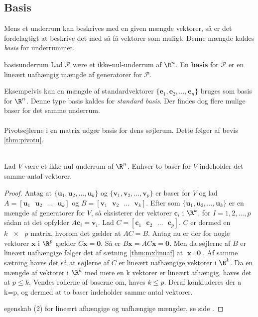 \subsection{Basis}
Mens et underrum kan beskrives med en given mængde vektorer, så er det fordelagtigt at beskrive det med så få vektorer som muligt. 
Denne mængde kaldes \textit{basis} for underrummet.
%
\begin{defn}{}{basisunderrum}
Lad $\mathcal{P}$ være et ikke-nul-underrum af $\R^n$. 
En \textbf{basis} for $\mathcal{P}$ er en lineært uafhængig mængde af generatorer for $\mathcal{P}$.
\end{defn}
\noindent
Eksempelvis kan en mængde af standardvektorer $\{\textbf{e}_1,\textbf{e}_2,\ldots,\textbf{e}_n\}$ bruges som basis for $\R^n$.
Denne type basis kaldes for \textit{standard basis}.
Der findes dog flere mulige baser for det samme underrum.
\\\\
%
Pivotsøjlerne i en matrix udgør basis for dens søjlerum. Dette følger af bevis \ref{thm:pivotu}.
\\\\
\begin{thm}{}{}
Lad $V$ være et ikke nul underrum af $\R^n$. Enhver to baser for $V$ indeholder det samme antal vektorer.
\end{thm}
\begin{proof}
Antag at $\{\textbf{u}_1,\textbf{u}_2,\ldots,\textbf{u}_k\} $ og $\{\textbf{v}_1,\textbf{v}_2,\ldots,\textbf{v}_p\} $ er baser for $V$ og lad $A=[\textbf{u}_1 \text{ } \textbf{u}_2 \text{ }  \ldots \text{ } \textbf{u}_k] $ og $B=[\textbf{v}_1 \text{ } \textbf{v}_2 \text{ }  \ldots \text{ } \textbf{v}_k] $.
Efter som $\{\textbf{u}_1,\textbf{u}_2,\ldots,\textbf{u}_k\} $ er en mængde af generatorer for $V$, så eksisterer der vektorer $\textbf{c}_i$ i $\R^k$, for $I=1,2,\ldots,p$ sådan at det opfylder $A\textbf{c}_i=\textbf{v}_i$.
Lad $C=[\textbf{c}_1 \text{ } \textbf{c}_2 \text{ } \ldots \text{ } \textbf{c}_p]$.
$C$ er dermed en $ k \text{ } \times \text{ } p$ matrix, hvorom det gælder at $AC=B$.
Antag nu er der for nogle vektorer $\textbf{x}$ i $\R^p$ gælder $C\textbf{x}=\textbf{0}$. 
Så er $B\textbf{x}=AC\textbf{x}=\textbf{0}$. 
Men da søjlerne af $B$ er lineært uafhængige følger det af sætning \ref{thm:mxlinuaf} at $\textbf{x}=\textbf{0}$.
Af samme sætning haves det så at søjlerne af $C$ er lineært uafhængige vektorer i $\R^k$.
Da en mængde af vektorer i $\R^k$ med mere en k vektorer er lineært afhængig, haves det at $p\leq k$. 
Vendes rollerne af baserne om, haves $k \leq p$. 
Deraf konkluderes der a k=p, og dermed at to baser indeholder samme antal vektorer. 

egenskab (2) for lineært afhængige og uafhængige mængder, se side \pageref{egenskab_lin}.
\end{proof}